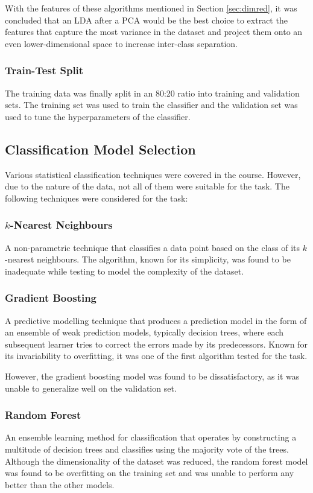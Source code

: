 \documentclass[conference]{IEEEtran}
\begin{document}
    With the features of these algorithms mentioned in Section \ref{sec:dimred}, it was concluded that an LDA after a PCA would be the best choice
    to extract the features that capture the most variance in the dataset and project them onto an even lower-dimensional space to increase inter-class separation.

    \subsubsection{Train-Test Split}
    The training data was finally split in an 80:20 ratio into training and validation sets.
    The training set was used to train the classifier and the validation set was used to tune the hyperparameters of the classifier.

    \subsection{Classification Model Selection}
    \label{sec:modelselection}
    Various statistical classification techniques were covered in the course.
    However, due to the nature of the data, not all of them were suitable for the task.
    The following techniques were considered for the task:

    \subsubsection{$k$-Nearest Neighbours}
    \label{sec:knn}
    A non-parametric technique that classifies a data point based on the class of its $k$-nearest neighbours.
    The algorithm, known for its simplicity, was found to be inadequate while testing to model the complexity of the dataset.

    \subsubsection{Gradient Boosting}
    \label{sec:gb}
    A predictive modelling technique that produces a prediction model in the form of an ensemble of weak prediction models, typically decision trees,
    where each subsequent learner tries to correct the errors made by its predecessors.
    Known for its invariability to overfitting, it was one of the first algorithm tested for the task.

    However, the gradient boosting model was found to be dissatisfactory, as it was unable to generalize well on the validation set.

    \subsubsection{Random Forest}
    \label{sec:rf}
    An ensemble learning method for classification that operates by constructing a multitude of decision trees and classifies using the majority vote of the trees.
    Although the dimensionality of the dataset was reduced, the random forest model was found to be overfitting on the training set
    and was unable to perform any better than the other models.
\end{document}

